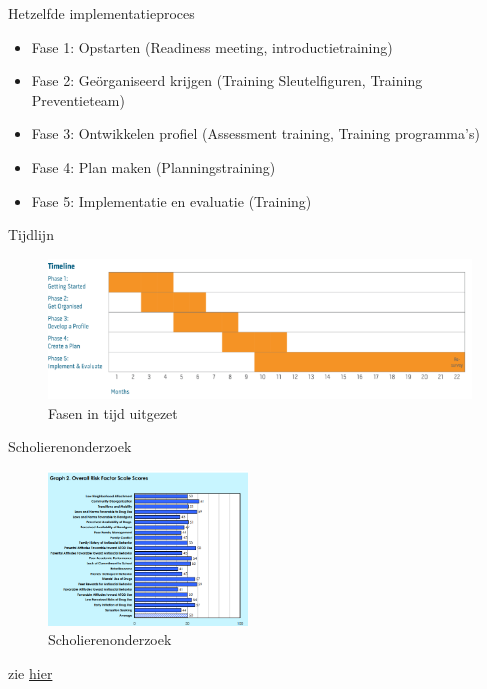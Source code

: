 \documentclass[
  ignorenonframetext,
]{beamer}
\providecommand{\tightlist}{%
  \setlength{\itemsep}{0pt}\setlength{\parskip}{0pt}}\usepackage{longtable,booktabs,array}
\begin{document}
\begin{frame}{Hetzelfde implementatieproces}
\protect\hypertarget{hetzelfde-implementatieproces}{}
\begin{itemize}
\tightlist
\item
  Fase 1: Opstarten (Readiness meeting, introductietraining)\\
\item
  Fase 2: Geörganiseerd krijgen (Training Sleutelfiguren, Training
  Preventieteam)\\
\item
  Fase 3: Ontwikkelen profiel (Assessment training, Training
  programma's)\\
\item
  Fase 4: Plan maken (Planningstraining)\\
\item
  Fase 5: Implementatie en evaluatie (Training)
\end{itemize}
\end{frame}

\begin{frame}{Tijdlijn}
\protect\hypertarget{tijdlijn}{}
\begin{figure}

{\centering \includegraphics{images/Tijdlijn.png}

}

\caption{Fasen in tijd uitgezet}

\end{figure}
\end{frame}

\begin{frame}{Scholierenonderzoek}
\protect\hypertarget{scholierenonderzoek}{}
\begin{figure}

{\centering \includegraphics[width=2.08333in,height=\textheight]{images/Scholierenonderzoek.png}

}

\caption{Scholierenonderzoek}

\end{figure}

zie
\href{https://rothenbach-research.com/surveys/CTCYS_Sample_Report.pdf}{hier}
\end{frame}
\end{document}
